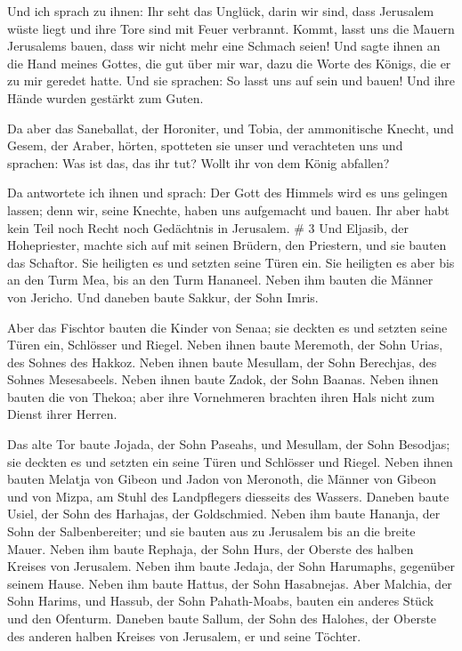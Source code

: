  Und ich sprach zu ihnen: Ihr seht das Unglück, darin wir
sind, dass Jerusalem wüste liegt und ihre Tore sind mit Feuer verbrannt.
Kommt, lasst uns die Mauern Jerusalems bauen, dass wir nicht mehr eine
Schmach seien!  Und sagte ihnen an die Hand meines Gottes,
die gut über mir war, dazu die Worte des Königs, die er zu mir geredet
hatte. Und sie sprachen: So lasst uns auf sein und bauen! Und ihre Hände
wurden gestärkt zum Guten.

 Da aber das Saneballat, der Horoniter, und Tobia, der
ammonitische Knecht, und Gesem, der Araber, hörten, spotteten sie unser
und verachteten uns und sprachen: Was ist das, das ihr tut? Wollt ihr
von dem König abfallen?

 Da antwortete ich ihnen und sprach: Der Gott des Himmels
wird es uns gelingen lassen; denn wir, seine Knechte, haben uns
aufgemacht und bauen. Ihr aber habt kein Teil noch Recht noch Gedächtnis
in Jerusalem. \# 3  Und Eljasib, der Hohepriester, machte
sich auf mit seinen Brüdern, den Priestern, und sie bauten das Schaftor.
Sie heiligten es und setzten seine Türen ein. Sie heiligten es aber bis
an den Turm Mea, bis an den Turm Hananeel.  Neben ihm bauten
die Männer von Jericho. Und daneben baute Sakkur, der Sohn Imris.

 Aber das Fischtor bauten die Kinder von Senaa; sie deckten
es und setzten seine Türen ein, Schlösser und Riegel.  Neben
ihnen baute Meremoth, der Sohn Urias, des Sohnes des Hakkoz. Neben ihnen
baute Mesullam, der Sohn Berechjas, des Sohnes Mesesabeels. Neben ihnen
baute Zadok, der Sohn Baanas.  Neben ihnen bauten die von
Thekoa; aber ihre Vornehmeren brachten ihren Hals nicht zum Dienst ihrer
Herren.

 Das alte Tor baute Jojada, der Sohn Paseahs, und Mesullam,
der Sohn Besodjas; sie deckten es und setzten ein seine Türen und
Schlösser und Riegel.  Neben ihnen bauten Melatja von Gibeon
und Jadon von Meronoth, die Männer von Gibeon und von Mizpa, am Stuhl
des Landpflegers diesseits des Wassers.  Daneben baute
Usiel, der Sohn des Harhajas, der Goldschmied. Neben ihm baute Hananja,
der Sohn der Salbenbereiter; und sie bauten aus zu Jerusalem bis an die
breite Mauer.  Neben ihm baute Rephaja, der Sohn Hurs, der
Oberste des halben Kreises von Jerusalem.  Neben ihm baute
Jedaja, der Sohn Harumaphs, gegenüber seinem Hause. Neben ihm baute
Hattus, der Sohn Hasabnejas.  Aber Malchia, der Sohn
Harims, und Hassub, der Sohn Pahath-Moabs, bauten ein anderes Stück und
den Ofenturm.  Daneben baute Sallum, der Sohn des Halohes,
der Oberste des anderen halben Kreises von Jerusalem, er und seine
Töchter.

